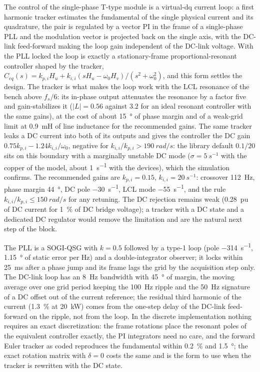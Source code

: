 \documentclass[10pt,a4paper]{scrartcl}
\newcommand{\wo}{\omega_0}
\newcommand{\kpi}{k_{p,i}}
\newcommand{\kii}{k_{i,i}}
\newcommand{\Ceq}{C_{eq}}
\newcommand{\Hu}{H_u}
\newcommand{\Hv}{H_v}
\begin{document}
\begin{onehalfspace}
The control of the single-phase T-type module is a virtual-dq current loop: a first harmonic tracker estimates the fundamental of the single physical current and its quadrature, the pair is regulated by a vector PI in the frame of a single-phase PLL and the modulation vector is projected back on the single axis, with the DC-link feed-forward making the loop gain independent of the DC-link voltage. With the PLL locked the loop is exactly a stationary-frame proportional-resonant controller shaped by the tracker, $\Ceq(s) = \kpi\Hu + \kii(s\Hu - \wo\Hv)/(s^2 + \wo^2)$, and this form settles the design. The tracker is what makes the loop work with the LCL resonance of the bench above $f_s/6$: its in-phase output attenuates the resonance by a factor five and gain-stabilizes it ($|L| = 0.56$ against $3.2$ for an ideal resonant controller with the same gains), at the cost of about \SI{15}{\degree} of phase margin and of a weak-grid limit at \SI{0.9}{mH} of line inductance for the recommended gains. The same tracker leaks a DC current into both of its outputs and gives the controller the DC gain $0.75\kpi - 1.24\kii/\wo$, negative for $\kii/\kpi > \SI{190}{rad/s}$: the library default $0.1/20$ sits on this boundary with a marginally unstable DC mode ($\sigma = \SI{+5}{s^{-1}}$ with the copper of the model, about \SI{+1}{s^{-1}} with the devices), which the simulation confirms. The recommended gains are $\kpi = 0.15$, $\kii = \SI{20}{s^{-1}}$: crossover \SI{112}{Hz}, phase margin \SI{44}{\degree}, DC pole \SI{-30}{s^{-1}}, LCL mode \SI{-55}{s^{-1}}, and the rule $\kii/\kpi \le \SI{150}{rad/s}$ for any retuning. The DC rejection remains weak (\SI{0.28}{pu} of DC current for \SI{1}{\percent} of DC bridge voltage); a tracker with a DC state and a dedicated DC regulator would remove the limitation and are the natural next step of the block.

The PLL is a SOGI-QSG with $k = 0.5$ followed by a type-1 loop (pole \SI{-314}{s^{-1}}, \SI{1.15}{\degree} of static error per Hz) and a double-integrator observer; it locks within \SI{25}{ms} after a phase jump and its frame lags the grid by the acquisition step only. The DC-link loop has an \SI{8}{Hz} bandwidth with \SI{45}{\degree} of margin, the moving average over one grid period keeping the \SI{100}{Hz} ripple and the \SI{50}{Hz} signature of a DC offset out of the current reference; the residual third harmonic of the current (\SI{1.3}{\percent} at \SI{20}{kW}) comes from the one-step delay of the DC-link feed-forward on the ripple, not from the loop. In the discrete implementation nothing requires an exact discretization: the frame rotations place the resonant poles of the equivalent controller exactly, the PI integrators need no care, and the forward Euler tracker as coded reproduces the fundamental within \SI{0.2}{\percent} and \SI{1.5}{\degree}; the exact rotation matrix with $\delta = 0$ costs the same and is the form to use when the tracker is rewritten with the DC state.


\end{onehalfspace}
\end{document}
